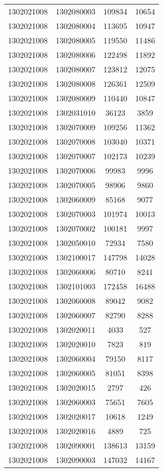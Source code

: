\begin{longtable}[h]{llcc}
		1302021008 & 1302080003 & 109834 & 10654\\
		1302021008 & 1302080004 & 113695 & 10947\\
		1302021008 & 1302080005 & 119550 & 11486\\
		1302021008 & 1302080006 & 122498 & 11892\\
		1302021008 & 1302080007 & 123812 & 12075\\
		1302021008 & 1302080008 & 126361 & 12509\\
		1302021008 & 1302080009 & 110440 & 10847\\
		1302021008 & 1302031010 & 36123 & 3859\\
		1302021008 & 1302070009 & 109256 & 11362\\
		1302021008 & 1302070008 & 103040 & 10371\\
		1302021008 & 1302070007 & 102173 & 10239\\
		1302021008 & 1302070006 & 99983 & 9996\\
		1302021008 & 1302070005 & 98906 & 9860\\
		1302021008 & 1302060009 & 85168 & 9077\\
		1302021008 & 1302070003 & 101974 & 10013\\
		1302021008 & 1302070002 & 100181 & 9997\\
		1302021008 & 1302050010 & 72934 & 7580\\
		1302021008 & 1302100017 & 147798 & 14028\\
		1302021008 & 1302060006 & 80710 & 8241\\
		1302021008 & 1302101003 & 172458 & 16488\\
		1302021008 & 1302060008 & 89042 & 9082\\
		1302021008 & 1302060007 & 82790 & 8288\\
		1302021008 & 1302020011 & 4033 & 527\\
		1302021008 & 1302020010 & 7823 & 819\\
		1302021008 & 1302060004 & 79150 & 8117\\
		1302021008 & 1302060005 & 81051 & 8398\\
		1302021008 & 1302020015 & 2797 & 426\\
		1302021008 & 1302060003 & 75651 & 7605\\
		1302021008 & 1302020017 & 10618 & 1249\\
		1302021008 & 1302020016 & 4889 & 725\\
		1302021008 & 1302090001 & 138613 & 13159\\
		1302021008 & 1302090003 & 147032 & 14167\\

\end{longtable}
